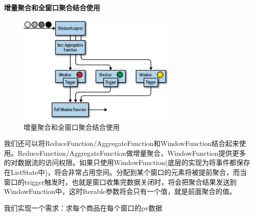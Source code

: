 \documentclass[cn,11pt,chinese]{elegantbook}
\begin{document}
\textbf{增量聚合和全窗口聚合结合使用}

\begin{figure}[htbp]
    \centering
    \includegraphics[width=0.7\textwidth]{images/spaf_0606.png}
    \caption{增量聚合和全窗口聚合结合使用}
\end{figure}

我们还可以将ReduceFunction/AggregateFunction和WindowFunction结合起来使用。ReduceFunction/AggregateFunction做增量聚合，WindowFunction提供更多的对数据流的访问权限。如果只使用WindowFunction(底层的实现为将事件都保存在ListState中)，将会非常占用空间。分配到某个窗口的元素将被提前聚合，而当窗口的trigger触发时，也就是窗口收集完数据关闭时，将会把聚合结果发送到WindowFunction中，这时Iterable参数将会只有一个值，就是前面聚合的值。

我们实现一个需求：求每个商品在每个窗口的pv数据
\end{document}
